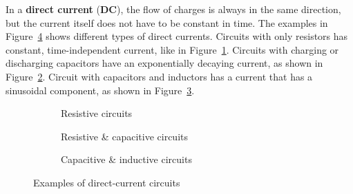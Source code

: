 In a \textbf{direct current} (\textbf{DC}), the flow of charges is always in
the same direction, but the current itself does not have to be constant in
time. The examples in Figure~\ref{fig:DC-examples} shows different types of
direct currents. Circuits with only resistors has constant, time-independent
current, like in Figure~\ref{fig:resistive-dc}. Circuits with charging or
discharging capacitors have an exponentially decaying current, as shown in
Figure~\ref{fig:capacitive-dc}. Circuit with capacitors and inductors has a
current that has a sinusoidal component, as shown in
Figure~\ref{fig:unductive-dc}.
\begin{figure}[ht]
  \centering
  \begin{subfigure}{.28\textwidth}
    \centering
    \caption{Resistive circuits}
    \label{fig:resistive-dc}
  \end{subfigure}
  \begin{subfigure}{.34\textwidth}
    \centering
    \caption{Resistive \& capacitive circuits}
    \label{fig:capacitive-dc}
  \end{subfigure}
  \begin{subfigure}{.34\textwidth}
    \centering
    \caption{Capacitive \& inductive circuits}
    \label{fig:unductive-dc}
  \end{subfigure}
  \caption{Examples of direct-current circuits}
  \label{fig:DC-examples}
\end{figure}



